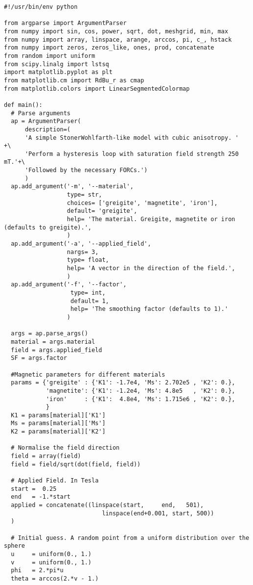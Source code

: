 \begin{lstlisting}
#!/usr/bin/env python

from argparse import ArgumentParser
from numpy import sin, cos, power, sqrt, dot, meshgrid, min, max
from numpy import array, linspace, arange, arccos, pi, c_, hstack
from numpy import zeros, zeros_like, ones, prod, concatenate
from random import uniform
from scipy.linalg import lstsq
import matplotlib.pyplot as plt
from matplotlib.cm import RdBu_r as cmap
from matplotlib.colors import LinearSegmentedColormap

def main():
  # Parse arguments
  ap = ArgumentParser(
      description=(
      'A simple StonerWohlfarth-like model with cubic anisotropy. '     +\
      'Perform a hysteresis loop with saturation field strength 250 mT.'+\
      'Followed by the necessary FORCs.')
      )
  ap.add_argument('-m', '--material',
                  type= str,
                  choices= ['greigite', 'magnetite', 'iron'],
                  default= 'greigite',
                  help= 'The material. Greigite, magnetite or iron (defaults to greigite).',
                  )
  ap.add_argument('-a', '--applied_field',
                  nargs= 3,
                  type= float,
                  help= 'A vector in the direction of the field.',
                  )
  ap.add_argument('-f', '--factor',
                   type= int,
                   default= 1,
                   help= 'The smoothing factor (defaults to 1).'
                  )

  args = ap.parse_args()
  material = args.material
  field = args.applied_field
  SF = args.factor

  #Magnetic parameters for different materials
  params = {'greigite' : {'K1': -1.7e4, 'Ms': 2.702e5 , 'K2': 0.},
            'magnetite': {'K1': -1.2e4, 'Ms': 4.8e5   , 'K2': 0.},
            'iron'     : {'K1':  4.8e4, 'Ms': 1.715e6 , 'K2': 0.},
            }
  K1 = params[material]['K1']
  Ms = params[material]['Ms']
  K2 = params[material]['K2']

  # Normalise the field direction
  field = array(field)
  field = field/sqrt(dot(field, field))

  # Applied Field. In Tesla
  start =  0.25
  end   = -1.*start
  applied = concatenate((linspace(start,     end,   501),
                            linspace(end+0.001, start, 500))
  )

  # Initial guess. A random point from a uniform distribution over the sphere
  u     = uniform(0., 1.)
  v     = uniform(0., 1.)
  phi   = 2.*pi*u
  theta = arccos(2.*v - 1.)


\end{lstlisting}
